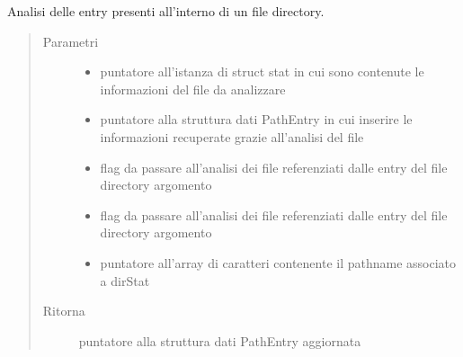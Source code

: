 \documentclass[letterpaper,10pt,italian,openany,oneside]{sphinxmanual}
\begin{document}
\begin{fulllineitems}
\label{\detokenize{code/inputscan:c.directoryAnalisis}}
Analisi delle entry presenti all’interno di un file directory.
\begin{quote}\begin{description}
\item[{Parametri}] \leavevmode\begin{itemize}
\item {} 
 \textendash{} puntatore all’istanza di struct stat in cui sono contenute le informazioni del file da analizzare

\item {} 
 \textendash{} puntatore alla struttura dati PathEntry in cui inserire le informazioni recuperate grazie all’analisi del file

\item {} 
 \textendash{} flag da passare all’analisi dei file referenziati dalle entry del file directory argomento

\item {} 
 \textendash{} flag da passare all’analisi dei file referenziati dalle entry del file directory argomento

\item {} 
 \textendash{} puntatore all’array di caratteri contenente il pathname associato a dirStat

\end{itemize}

\item[{Ritorna}] \leavevmode
puntatore alla struttura dati PathEntry aggiornata

\end{description}\end{quote}

\end{fulllineitems}

\end{document}
